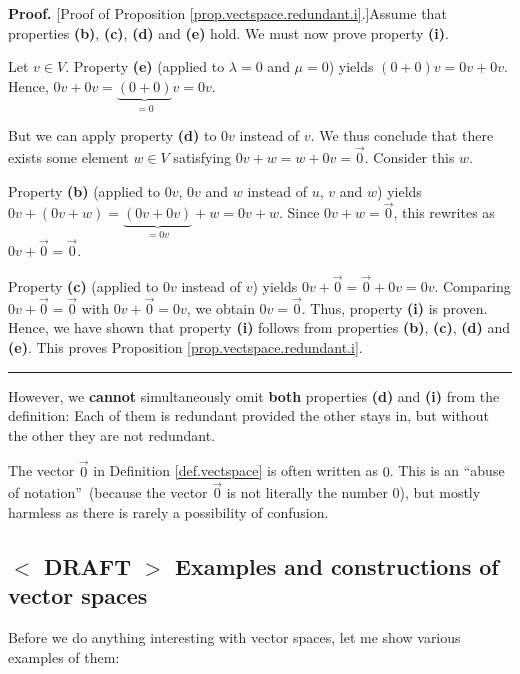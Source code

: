 \documentclass[numbers=enddot,12pt,final,onecolumn,notitlepage]{scrartcl}%
\theoremstyle{definition}
\newenvironment{proof}[1][Proof]{\noindent\textbf{#1.} }{\ \rule{0.5em}{0.5em}}
\begin{document}
\begin{proof}
[Proof of Proposition \ref{prop.vectspace.redundant.i}.]Assume that properties
\textbf{(b)}, \textbf{(c)}, \textbf{(d)} and \textbf{(e)} hold. We must now
prove property \textbf{(i)}.

Let $v\in V$. Property \textbf{(e)} (applied to $\lambda=0$ and $\mu=0$)
yields $\left(  0+0\right)  v=0v+0v$. Hence, $0v+0v=\underbrace{\left(
0+0\right)  }_{=0}v=0v$.

But we can apply property \textbf{(d)} to $0v$ instead of $v$. We thus
conclude that there exists some element $w\in V$ satisfying
$0v+w=w+0v=\overrightarrow{0}$. Consider this $w$.

Property \textbf{(b)} (applied to $0v$, $0v$ and $w$ instead of $u$, $v$ and
$w$) yields $0v+\left(  0v+w\right)  =\underbrace{\left(  0v+0v\right)
}_{=0v}+w=0v+w$. Since $0v+w=\overrightarrow{0}$, this rewrites as
$0v+\overrightarrow{0}=\overrightarrow{0}$.

Property \textbf{(c)} (applied to $0v$ instead of $v$) yields
$0v+\overrightarrow{0}=\overrightarrow{0}+0v=0v$. Comparing
$0v+\overrightarrow{0}=\overrightarrow{0}$ with $0v+\overrightarrow{0}=0v$, we
obtain $0v=\overrightarrow{0}$. Thus, property \textbf{(i)} is proven. Hence,
we have shown that property \textbf{(i)} follows from properties \textbf{(b)},
\textbf{(c)}, \textbf{(d)} and \textbf{(e)}. This proves Proposition
\ref{prop.vectspace.redundant.i}.
\end{proof}

However, we \textbf{cannot} simultaneously omit \textbf{both} properties
\textbf{(d)} and \textbf{(i)} from the definition: Each of them is redundant
provided the other stays in, but without the other they are not redundant.

The vector $\overrightarrow{0}$ in Definition \ref{def.vectspace} is often
written as $0$. This is an \textquotedblleft abuse of
notation\textquotedblright\ (because the vector $\overrightarrow{0}$ is not
literally the number $0$), but mostly harmless as there is rarely a
possibility of confusion.

\subsection{%
$<$%
DRAFT%
$>$
Examples and constructions of vector spaces}

Before we do anything interesting with vector spaces, let me show various
examples of them:
\end{document}
